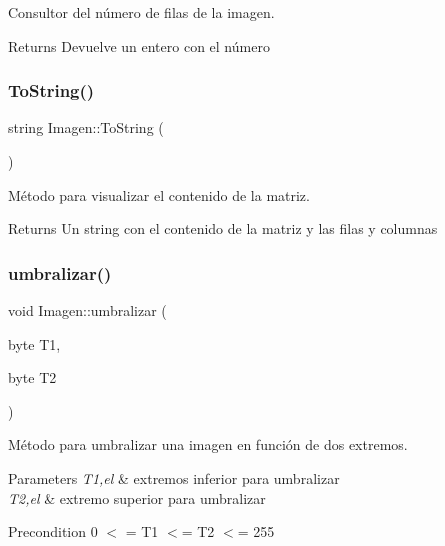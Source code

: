 Consultor del número de filas de la imagen. 

\begin{DoxyReturn}{Returns}
Devuelve un entero con el número 
\end{DoxyReturn}
\mbox{\label{classImagen_a258fbb5b40592cc96bcdf6ddda578b8d}} 
\subsubsection{\texorpdfstring{To\+String()}{ToString()}}
{\footnotesize\ttfamily string Imagen\+::\+To\+String (\begin{DoxyParamCaption}{ }\end{DoxyParamCaption})}



Método para visualizar el contenido de la matriz. 

\begin{DoxyReturn}{Returns}
Un string con el contenido de la matriz y las filas y columnas 
\end{DoxyReturn}
\mbox{\label{classImagen_a662dc0df56563c90691f17101308fcd2}} 
\subsubsection{\texorpdfstring{umbralizar()}{umbralizar()}}
{\footnotesize\ttfamily void Imagen\+::umbralizar (\begin{DoxyParamCaption}\item[{byte}]{T1,  }\item[{byte}]{T2 }\end{DoxyParamCaption})}



Método para umbralizar una imagen en función de dos extremos. 


\begin{DoxyParams}{Parameters}
{\em T1,el} & extremos inferior para umbralizar \\
\hline
{\em T2,el} & extremo superior para umbralizar \\
\hline
\end{DoxyParams}
\begin{DoxyPrecond}{Precondition}
0 $<$ = T1 $<$= T2 $<$= 255 
\end{DoxyPrecond}
\mbox{\label{classImagen_a7d9378695a7fd2dce8092f180e716229}} 
